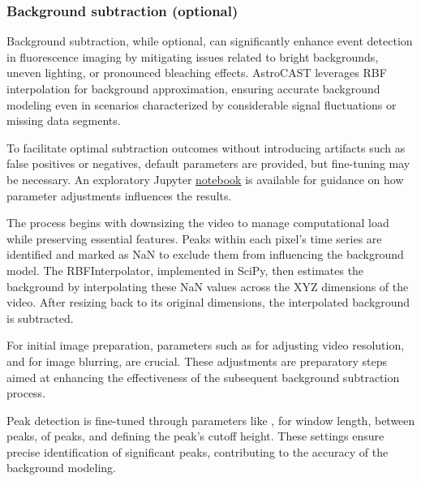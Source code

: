 
\subsubsection{Background subtraction (optional)}
\label{subsubsec:background}

Background subtraction, while optional, can significantly enhance event detection in fluorescence imaging by mitigating issues related to bright backgrounds, uneven lighting, or pronounced bleaching effects. AstroCAST leverages \ac{RBF} interpolation for background approximation, ensuring accurate background modeling even in scenarios characterized by considerable signal fluctuations or missing data segments.

To facilitate optimal subtraction outcomes without introducing artifacts such as false positives or negatives, default parameters are provided, but fine-tuning may be necessary. An exploratory Jupyter \href{https://github.com/janreising/astroCAST/blob/8451394bc0d810c4037011f0bcb9cba1f10d1e72/notebooks/dev/exploring_delta.ipynb}{notebook} is available for guidance on how parameter adjustments influences the results.

The process begins with downsizing the video to manage computational load while preserving essential features. Peaks within each pixel's time series are identified and marked as NaN to exclude them from influencing the background model. The RBFInterpolator, implemented in SciPy\citep{virtanen_scipy_2020}, then estimates the background by interpolating these NaN values across the XYZ dimensions of the video. After resizing back to its original dimensions, the interpolated background is subtracted.

For initial image preparation, parameters such as  for adjusting video resolution,  and  for image blurring, are crucial. These adjustments are preparatory steps aimed at enhancing the effectiveness of the subsequent background subtraction process.

Peak detection is fine-tuned through parameters like ,  for window length,  between peaks,  of peaks, and  defining the peak's cutoff height. These settings ensure precise identification of significant peaks, contributing to the accuracy of the background modeling.

